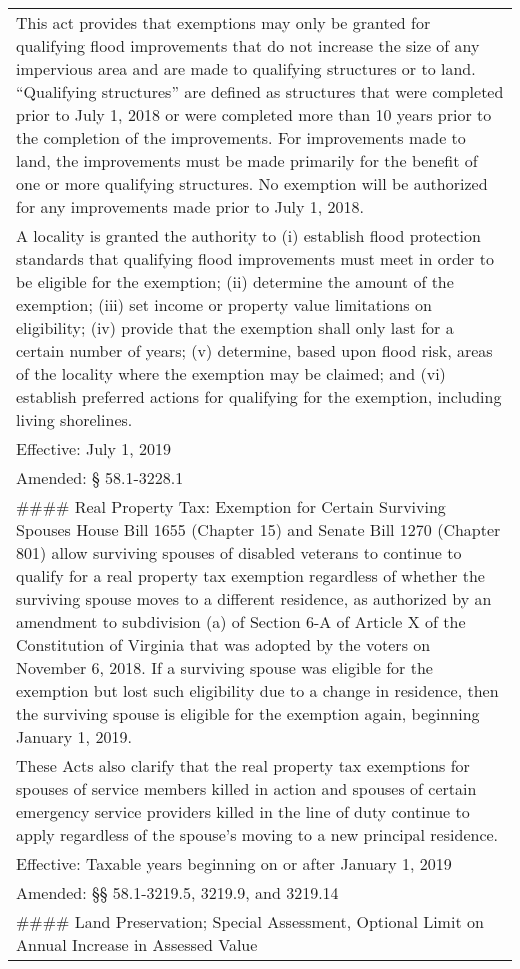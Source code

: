 \documentclass[
]{book}
\begin{document}
\begin{longtable}[]{@{}
  >{\raggedright\arraybackslash}p{}@{}}
This act provides that exemptions may only be granted for qualifying flood improvements that do not increase the size of any impervious area and are made to qualifying structures or to land. ``Qualifying structures'' are defined as structures that were completed prior to July 1, 2018 or were completed more than 10 years prior to the completion of the improvements. For improvements made to land, the improvements must be made primarily for the benefit of one or more qualifying structures. No exemption will be authorized for any improvements made prior to July 1, 2018. \\
A locality is granted the authority to (i) establish flood protection standards that qualifying flood improvements must meet in order to be eligible for the exemption; (ii) determine the amount of the exemption; (iii) set income or property value limitations on eligibility; (iv) provide that the exemption shall only last for a certain number of years; (v) determine, based upon flood risk, areas of the locality where the exemption may be claimed; and (vi) establish preferred actions for qualifying for the exemption, including living shorelines. \\
Effective: July 1, 2019 \\
Amended: § 58.1-3228.1 \\
\#\#\#\# Real Property Tax: Exemption for Certain Surviving Spouses
House Bill 1655 (Chapter 15) and Senate Bill 1270 (Chapter 801) allow surviving spouses of disabled veterans to continue to qualify for a real property tax exemption regardless of whether the surviving spouse moves to a different residence, as authorized by an amendment to subdivision (a) of Section 6-A of Article X of the Constitution of Virginia that was adopted by the voters on November 6, 2018. If a surviving spouse was eligible for the exemption but lost such eligibility due to a change in residence, then the surviving spouse is eligible for the exemption again, beginning January 1, 2019. \\
These Acts also clarify that the real property tax exemptions for spouses of service members killed in action and spouses of certain emergency service providers killed in the line of duty continue to apply regardless of the spouse's moving to a new principal residence. \\
Effective: Taxable years beginning on or after January 1, 2019 \\
Amended: §§ 58.1-3219.5, 3219.9, and 3219.14 \\
\#\#\#\# Land Preservation; Special Assessment, Optional Limit on Annual Increase in Assessed Value

\end{longtable}
\end{document}
